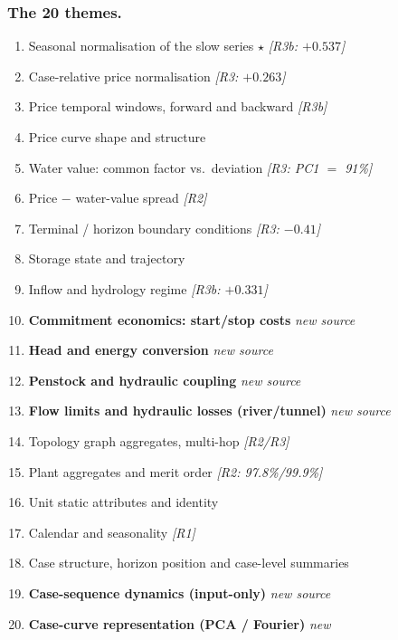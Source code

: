 
\subsubsection*{The 20 themes.}

\begin{enumerate}\itemsep2pt
  \item Seasonal normalisation of the slow series $\star$ \hfill \emph{[R3b: $+0.537$]}
  \item Case-relative price normalisation \hfill \emph{[R3: $+0.263$]}
  \item Price temporal windows, forward and backward \hfill \emph{[R3b]}
  \item Price curve shape and structure
  \item Water value: common factor vs.\ deviation \hfill \emph{[R3: PC1 $=$ 91\%]}
  \item Price $-$ water-value spread \hfill \emph{[R2]}
  \item Terminal / horizon boundary conditions \hfill \emph{[R3: $-0.41$]}
  \item Storage state and trajectory
  \item Inflow and hydrology regime \hfill \emph{[R3b: $+0.331$]}
  \item \textbf{Commitment economics: start/stop costs} \hfill \emph{new source}
  \item \textbf{Head and energy conversion} \hfill \emph{new source}
  \item \textbf{Penstock and hydraulic coupling} \hfill \emph{new source}
  \item \textbf{Flow limits and hydraulic losses (river/tunnel)} \hfill \emph{new source}
  \item Topology graph aggregates, multi-hop \hfill \emph{[R2/R3]}
  \item Plant aggregates and merit order \hfill \emph{[R2: 97.8\%/99.9\%]}
  \item Unit static attributes and identity
  \item Calendar and seasonality \hfill \emph{[R1]}
  \item Case structure, horizon position and case-level summaries
  \item \textbf{Case-sequence dynamics (input-only)} \hfill \emph{new source}
  \item \textbf{Case-curve representation (PCA / Fourier)} \hfill \emph{new}
\end{enumerate}

